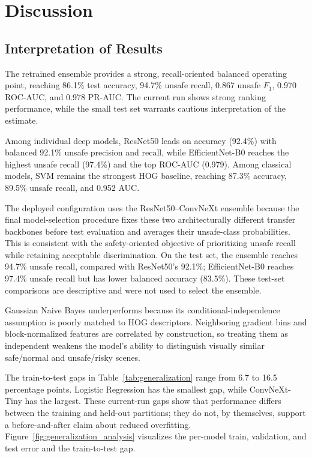 \documentclass{article}
\begin{document}
\section{Discussion}
\subsection{Interpretation of Results}
The retrained ensemble provides a strong, recall-oriented balanced operating point, reaching 86.1\% test accuracy, 94.7\% unsafe recall, 0.867 unsafe $F_1$, 0.970 ROC-AUC, and 0.978 PR-AUC. The current run shows strong ranking performance, while the small test set warrants cautious interpretation of the estimate.

Among individual deep models, ResNet50 leads on accuracy (92.4\%) with balanced 92.1\% unsafe precision and recall, while EfficientNet-B0 reaches the highest unsafe recall (97.4\%) and the top ROC-AUC (0.979). Among classical models, SVM remains the strongest HOG baseline, reaching 87.3\% accuracy, 89.5\% unsafe recall, and 0.952 AUC.

The deployed configuration uses the ResNet50--ConvNeXt ensemble because the final model-selection procedure fixes these two architecturally different transfer backbones before test evaluation and averages their unsafe-class probabilities. This is consistent with the safety-oriented objective of prioritizing unsafe recall while retaining acceptable discrimination. On the test set, the ensemble reaches 94.7\% unsafe recall, compared with ResNet50's 92.1\%; EfficientNet-B0 reaches 97.4\% unsafe recall but has lower balanced accuracy (83.5\%). These test-set comparisons are descriptive and were not used to select the ensemble.

Gaussian Naive Bayes underperforms because its conditional-independence assumption is poorly matched to HOG descriptors. Neighboring gradient bins and block-normalized features are correlated by construction, so treating them as independent weakens the model's ability to distinguish visually similar safe/normal and unsafe/risky scenes.

The train-to-test gaps in Table~\ref{tab:generalization} range from 6.7 to 16.5 percentage points. Logistic Regression has the smallest gap, while ConvNeXt-Tiny has the largest. These current-run gaps show that performance differs between the training and held-out partitions; they do not, by themselves, support a before-and-after claim about reduced overfitting. Figure~\ref{fig:generalization_analysis} visualizes the per-model train, validation, and test error and the train-to-test gap.
\end{document}

